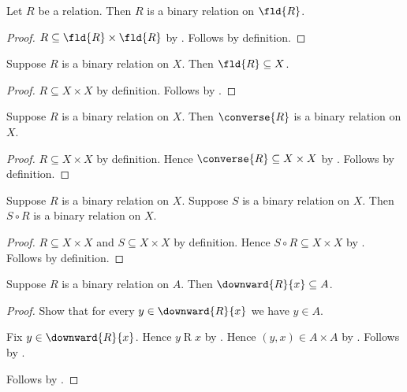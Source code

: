 \begin{classification}\label{relation_is_binary_relation_on_field}
    Let $R$ be a relation.
    Then $R$ is a binary relation on $\fld{R}$.
\end{classification}
\begin{proof}
    $R\subseteq\fld{R}\times\fld{R}$
        by .
    Follows by definition.
\end{proof}

\begin{proposition}\label{binary_relation_field_subseteq}
    Suppose $R$ is a binary relation on $X$.
    Then $\fld{R}\subseteq X$.
\end{proposition}
\begin{proof}
    $R\subseteq X\times X$ by definition.
    Follows by .
\end{proof}

\begin{classification}\label{converse_binary_relation_on}
    Suppose $R$ is a binary relation on $X$.
    Then $\converse{R}$ is a binary relation on $X$.
\end{classification}
\begin{proof}
    $R\subseteq X\times X$ by definition.
    Hence $\converse{R}\subseteq X\times X$ by .
    Follows by definition.
\end{proof}

\begin{classification}\label{circ_binary_relation_on}
    Suppose $R$ is a binary relation on $X$.
    Suppose $S$ is a binary relation on $X$.
    Then $S\circ R$ is a binary relation on $X$.
\end{classification}
\begin{proof}
    $R\subseteq X\times X$ and $S\subseteq X\times X$ by definition.
    Hence $S\circ R\subseteq X\times X$ by .
    Follows by definition.
\end{proof}

\begin{proposition}\label{binary_relation_downward_subseteq}
    Suppose $R$ is a binary relation on $A$.
    Then $\downward{R}{x}\subseteq A$.
\end{proposition}
\begin{proof}
    Show that for every $y\in\downward{R}{x}$ we have $y\in A$.
    \begin{subproof}
        Fix $y\in\downward{R}{x}$.
        Hence $y\mathrel{R}x$ by .
        Hence $(y,x)\in A\times A$ by .
        Follows by .
    \end{subproof}
    Follows by .
\end{proof}


